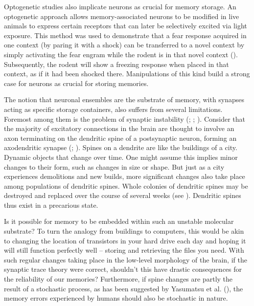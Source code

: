 \documentclass[
  jou,
  floatsintext,
  longtable,
  nolmodern,
  notxfonts,
  notimes,
  donotrepeattitle,
  colorlinks=true,linkcolor=blue,citecolor=blue,urlcolor=blue]{apa7}
\begin{document}
Optogenetic studies also implicate neurons as crucial for memory
storage. An optogenetic approach allows memory-associated neurons to be
modified in live animals to express certain receptors that can later be
selectively excited via light exposure. This method was used to
demonstrate that a fear response acquired in one context (by paring it
with a shock) can be transferred to a novel context by simply activating
the fear engram while the rodent is in that novel context
(). Subsequently,
the rodent will show a freezing response when placed in that context, as
if it had been shocked there. Manipulations of this kind build a strong
case for neurons as crucial for storing memories.

The notion that neuronal ensembles are the substrate of memory, with
synapses acting as specific storage containers, also suffers from
several limitations. Foremost among them is the problem of synaptic
instability (;
;
). Consider
that the majority of excitatory connections in the brain are thought to
involve an axon terminating on the dendritic spine of a postsynaptic
neuron, forming an axodendritic synapse
(;
). Spines on a dendrite are like the buildings of a city.
Dynamic objects that change over time. One might assume this implies
minor changes to their form, such as changes in size or shape. But just
as a city experiences demolitions and new builds, more significant
changes also take place among populations of dendritic spines. Whole
colonies of dendritic spines may be destroyed and replaced over the
course of several weeks (see
). Dendritic
spines thus exist in a precarious state.

Is it possible for memory to be embedded within such an unstable
molecular substrate? To turn the analogy from buildings to computers,
this would be akin to changing the location of transistors in your hard
drive each day and hoping it will still function perfectly well --
storing and retrieving the files you need. With such regular changes
taking place in the low-level morphology of the brain, if the synaptic
trace theory were correct, shouldn't this have drastic consequences for
the reliability of our memories? Furthermore, if spine changes are
partly the result of a stochastic process, as has been suggested by
Yasumatsu et al. (), the
memory errors experienced by humans should also be stochastic in nature.
\end{document}
